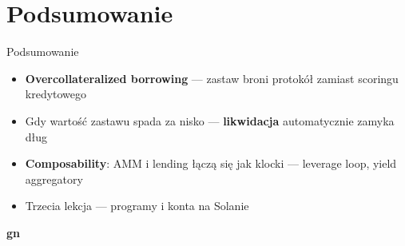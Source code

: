 \section{Podsumowanie}

\begin{frame}{Podsumowanie}
  \begin{itemize}
    \item \textbf{Overcollateralized borrowing} --- zastaw broni protokół zamiast scoringu kredytowego
    \item Gdy wartość zastawu spada za nisko --- \textbf{likwidacja} automatycznie zamyka dług
    \item \textbf{Composability}: AMM i lending łączą się jak klocki --- leverage loop, yield aggregatory
    \item Trzecia lekcja --- programy i konta na Solanie
  \end{itemize}
\end{frame}

\begin{frame}[plain]
  \begin{center}
    \vfill
    {\Huge\bfseries\color{stplwhite} gn}
    \vfill
  \end{center}
\end{frame}


